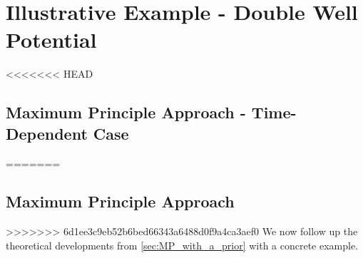 \documentclass{article}
\begin{document}
% 
% 
% 
% 
% 


\section{Illustrative Example - Double Well Potential}
<<<<<<< HEAD
\subsection{Maximum Principle Approach - Time-Dependent Case}
\label{sec:MP_Doublewell_TimeDependent}
=======
\subsection{Maximum Principle Approach}
>>>>>>> 6d1ee3c9eb52b6bed66343a6488d0f9a4ca3aef0
We now follow up the theoretical developments from \cref{sec:MP_with_a_prior}
with a concrete example.
\end{document}
